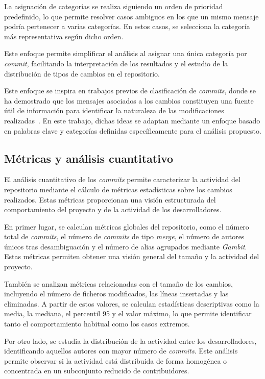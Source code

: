 \documentclass[a4paper, 12pt]{book}
\begin{document}
La asignación de categorías se realiza siguiendo un orden de prioridad predefinido, lo que permite resolver casos ambiguos en los que un mismo mensaje podría pertenecer a varias categorías. En estos casos, se selecciona la categoría más representativa según dicho orden.

Este enfoque permite simplificar el análisis al asignar una única categoría por \emph{commit}, facilitando la interpretación de los resultados y el estudio de la distribución de tipos de cambios en el repositorio.

Este enfoque se inspira en trabajos previos de clasificación de \emph{commits}, donde se ha demostrado que los mensajes asociados a los cambios constituyen una fuente útil de información para identificar la naturaleza de las modificaciones realizadas~\cite{hindle2009classifying}. En este trabajo, dichas ideas se adaptan mediante un enfoque basado en palabras clave y categorías definidas específicamente para el análisis propuesto.

\subsection{Métricas y análisis cuantitativo}
\label{subsec:metricas}

El análisis cuantitativo de los \emph{commits} permite caracterizar la actividad del repositorio mediante el cálculo de métricas estadísticas sobre los cambios realizados. Estas métricas proporcionan una visión estructurada del comportamiento del proyecto y de la actividad de los desarrolladores.

En primer lugar, se calculan métricas globales del repositorio, como el número total de \emph{commits}, el número de \emph{commits} de tipo \emph{merge}, el número de autores únicos tras desambiguación y el número de alias agrupados mediante \emph{Gambit}. Estas métricas permiten obtener una visión general del tamaño y la actividad del proyecto.

También se analizan métricas relacionadas con el tamaño de los cambios, incluyendo el número de ficheros modificados, las líneas insertadas y las eliminadas. A partir de estos valores, se calculan estadísticas descriptivas como la media, la mediana, el percentil 95 y el valor máximo, lo que permite identificar tanto el comportamiento habitual como los casos extremos.

Por otro lado, se estudia la distribución de la actividad entre los desarrolladores, identificando aquellos autores con mayor número de \emph{commits}. Este análisis permite observar si la actividad está distribuida de forma homogénea o concentrada en un subconjunto reducido de contribuidores.
\end{document}
